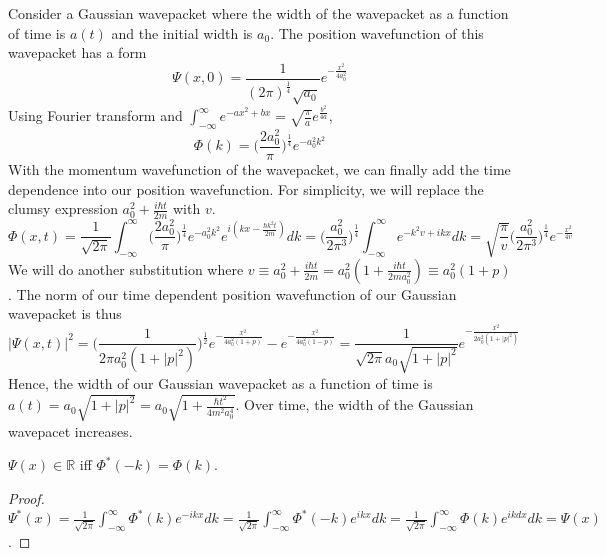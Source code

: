 \documentclass[a4paper]{article}
\begin{document}
\begin{eg}
Consider a Gaussian wavepacket where the width of the wavepacket as a function of time is $a(t)$ and the initial width is $a_0$. The position wavefunction of this wavepacket has a form
$$\Psi(x,0)=\frac{1}{(2\pi)^{\frac{1}{4}}\sqrt{a_0}}e^{-\frac{x^2}{4a_0^2}}$$
Using Fourier transform and $\int_{-\infty}^{\infty}e^{-ax^2+bx}=\sqrt{\frac{\pi}{a}}e^{\frac{b^2}{4a}}$,
$$\Phi(k)=\bigg(\frac{2a_0^2}{\pi}\bigg)^{\frac{1}{4}}e^{-a_0^2k^2}$$
With the momentum wavefunction of the wavepacket, we can finally add the time dependence into our position wavefunction. For simplicity, we will replace the clumsy expression $a_0^2+\frac{i\hbar t}{2m}$ with $v$.
$$\Phi(x,t)=\frac{1}{\sqrt{2\pi}}\int_{-\infty}^{\infty}\bigg(\frac{2a_0^2}{\pi}\bigg)^{\frac{1}{4}}e^{-a_0^2k^2}e^{i(kx-\frac{\hbar k^2t}{2m})}dk=\bigg(\frac{a_0^2}{2\pi^3}\bigg)^{\frac{1}{4}}\int_{-\infty}^{\infty}e^{-k^2v+ikx}dk=\sqrt{\frac{\pi}{v}}\bigg(\frac{a_0^2}{2\pi^3}\bigg)^{\frac{1}{4}}e^{-\frac{x^2}{4v}}$$
We will do another substitution where $v\equiv a_0^2+\frac{i\hbar t}{2m}=a_0^2(1+\frac{i\hbar t}{2ma_0^2})\equiv a_0^2(1+p)$. The norm of our time dependent position wavefunction of our Gaussian wavepacket is thus
$$|\Psi(x,t)|^2=\bigg(\frac{1}{2\pi a_0^2(1+|p|^2)}\bigg)^{\frac{1}{2}}e^{-\frac{x^2}{4a_0^2(1+p)}}-e^{-\frac{x^2}{4a_0^2(1-p)}}=\frac{1}{\sqrt{2\pi}a_0\sqrt{1+|p|^2}}e^{-\frac{x^2}{2a_0^2(1+|p|^2)}}$$
Hence, the width of our Gaussian wavepacket as a function of time is $a(t)=a_0\sqrt{1+|p|^2}=a_0\sqrt{1+\frac{\hbar t^2}{4m^2a_0^4}}$. Over time, the width of the Gaussian wavepacet increases.
\end{eg}
\begin{cor}
$\Psi(x)\in\mathbb{R}$ iff $\Phi^*(-k)=\Phi(k)$.
\end{cor}
\begin{proof}
$\Psi^*(x)=\frac{1}{\sqrt{2\pi}}\int_{-\infty}^\infty\Phi^*(k)e^{-ikx}dk=\frac{1}{\sqrt{2\pi}}\int_{-\infty}^\infty\Phi^*(-k)e^{ikx}dk=\frac{1}{\sqrt{2\pi}}\int_{-\infty}^\infty\Phi(k)e^{ikdx}dk=\Psi(x)$.
\end{proof}
\end{document}
